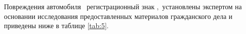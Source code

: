 \indent Повреждения автомобиля \, регистрационный знак ,\,  установлены экспертом на основании исследования предоставленных материалов гражданского дела  
и приведены ниже в таблице \ref{tab:5}.


